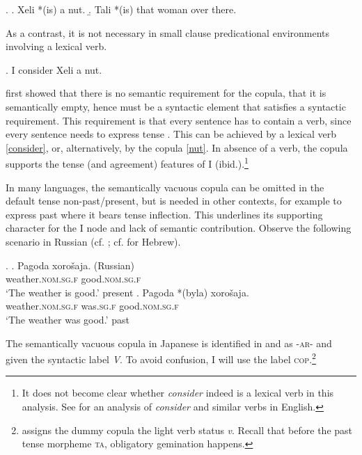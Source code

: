 \documentclass [output=book,colorlinks,citecolor=brown]{langscibook}
\begin{document}
\ex. \label{nut} \a. Xeli *(is) a nut.
\b. Tali *(is) that woman over there.

As a contrast, it is not necessary in small clause predicational environments involving a lexical verb.

\ex. I consider Xeli a nut. \label{consider} \null\hfill \citep[152]{rapoport:1987:copular}

\citet{rapoport:1987:copular} first showed that there is no semantic requirement for the copula, that it is semantically empty, hence must be a syntactic element that satisfies a syntactic requirement. This requirement is that every sentence has to contain a verb, since every sentence needs to express tense \citep[157]{rapoport:1987:copular}. This can be achieved by a lexical verb \ref{consider}, or, alternatively, by the copula \ref{nut}. In absence of a verb, the copula supports the tense (and agreement) features of \textsc{I} (ibid.).\footnote{It does not become clear whether \textit{consider} indeed is a lexical verb in this analysis. See \citet{bowers:1993:predication} for an analysis of \textit{consider} and similar verbs in English.} %

In many languages, the semantically vacuous copula can be omitted in the default tense non-past/present, but is needed in other contexts, for example to express past where it bears tense inflection. This underlines its supporting character for the I node and lack of semantic contribution. Observe the following scenario in Russian (cf. \citealt{babby:2010:syntactic}; cf. \citealt{doron:1983:verbless, rapoport:1987:copular} for Hebrew). %

\ex. \label{pagoda} \ag. Pagoda xorošaja. (Russian)\\
weather.\textsc{nom.sg.f} good.\textsc{nom.sg.f}\\
`The weather is good.' \null \hfill present
\bg. Pagoda *(byla) xorošaja.\\
weather.\textsc{nom.sg.f} was.\textsc{sg.f} good.\textsc{nom.sg.f}\\
`The weather was good.' \null \hfill past

The semantically vacuous copula in Japanese is identified in \citet{nishiyama:1999:adj} and \citet{urushibara:1993:syntactic} as -\textsc{ar}- and given the syntactic label \textit{V}. To avoid confusion, I will use the label \textsc{cop}.\footnote{\citet{watanabe:2013:non} assigns the dummy copula the light verb status \textit{v}. Recall that before the past tense morpheme \textsc{ta}, obligatory gemination happens.}
\end{document}
